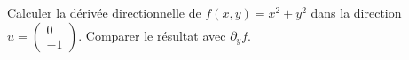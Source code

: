 
\begin{exercice}\label{exoOutilsMath-0042}

    Calculer la dérivée directionnelle de $f(x,y)=x^2+y^2$ dans la direction $u=\begin{pmatrix}
        0    \\ 
        -1    
    \end{pmatrix}$. Comparer le résultat avec $\partial_yf$.

\end{exercice}
